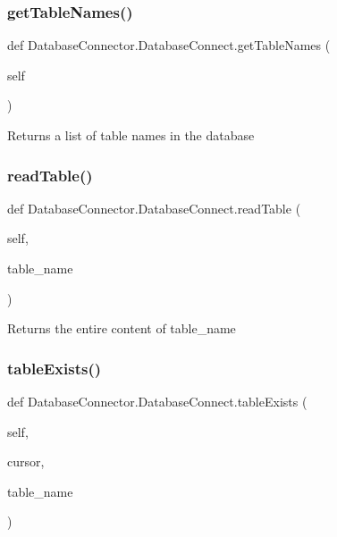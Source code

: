 \subsubsection{\texorpdfstring{get\+Table\+Names()}{getTableNames()}}
{\footnotesize\ttfamily def Database\+Connector.\+Database\+Connect.\+get\+Table\+Names (\begin{DoxyParamCaption}\item[{}]{self }\end{DoxyParamCaption})}

\begin{DoxyVerb}Returns a list of table names in the database\end{DoxyVerb}
 \mbox{\label{classDatabaseConnector_1_1DatabaseConnect_a18f9d359811b7bdab423f052fe65e05b}} 
\subsubsection{\texorpdfstring{read\+Table()}{readTable()}}
{\footnotesize\ttfamily def Database\+Connector.\+Database\+Connect.\+read\+Table (\begin{DoxyParamCaption}\item[{}]{self,  }\item[{}]{table\+\_\+name }\end{DoxyParamCaption})}

\begin{DoxyVerb}Returns the entire content of table_name\end{DoxyVerb}
 \mbox{\label{classDatabaseConnector_1_1DatabaseConnect_a2e58b915bdd35d819f25c110d258adc7}} 
\subsubsection{\texorpdfstring{table\+Exists()}{tableExists()}}
{\footnotesize\ttfamily def Database\+Connector.\+Database\+Connect.\+table\+Exists (\begin{DoxyParamCaption}\item[{}]{self,  }\item[{}]{cursor,  }\item[{}]{table\+\_\+name }\end{DoxyParamCaption})}

